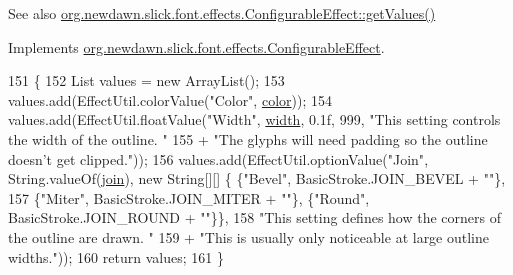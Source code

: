 \begin{DoxySeeAlso}{See also}
\mbox{\hyperlink{interfaceorg_1_1newdawn_1_1slick_1_1font_1_1effects_1_1_configurable_effect_ac4ea8fedf0f9d7ca7ffe1bd5543d78cb}{org.\+newdawn.\+slick.\+font.\+effects.\+Configurable\+Effect\+::get\+Values()}} 
\end{DoxySeeAlso}


Implements \mbox{\hyperlink{interfaceorg_1_1newdawn_1_1slick_1_1font_1_1effects_1_1_configurable_effect_ac4ea8fedf0f9d7ca7ffe1bd5543d78cb}{org.\+newdawn.\+slick.\+font.\+effects.\+Configurable\+Effect}}.


\begin{DoxyCode}
151                              \{
152         List values = \textcolor{keyword}{new} ArrayList();
153         values.add(EffectUtil.colorValue(\textcolor{stringliteral}{"Color"}, \mbox{\hyperlink{classorg_1_1newdawn_1_1slick_1_1font_1_1effects_1_1_outline_effect_a00160c4c005cb659d45c135a2798005f}{color}}));
154         values.add(EffectUtil.floatValue(\textcolor{stringliteral}{"Width"}, \mbox{\hyperlink{classorg_1_1newdawn_1_1slick_1_1font_1_1effects_1_1_outline_effect_aad96e33c4fb5804e7423df04e1cc1936}{width}}, 0.1f, 999, \textcolor{stringliteral}{"This setting controls the width
       of the outline. "}
155             + \textcolor{stringliteral}{"The glyphs will need padding so the outline doesn't get clipped."}));
156         values.add(EffectUtil.optionValue(\textcolor{stringliteral}{"Join"}, String.valueOf(\mbox{\hyperlink{classorg_1_1newdawn_1_1slick_1_1font_1_1effects_1_1_outline_effect_a913a20571098d37c45f5aff95ff844f9}{join}}), \textcolor{keyword}{new} String[][] \{ \{\textcolor{stringliteral}{"Bevel"}, 
      BasicStroke.JOIN\_BEVEL + \textcolor{stringliteral}{""}\},
157             \{\textcolor{stringliteral}{"Miter"}, BasicStroke.JOIN\_MITER + \textcolor{stringliteral}{""}\}, \{\textcolor{stringliteral}{"Round"}, BasicStroke.JOIN\_ROUND + \textcolor{stringliteral}{""}\}\},
158             \textcolor{stringliteral}{"This setting defines how the corners of the outline are drawn. "}
159                 + \textcolor{stringliteral}{"This is usually only noticeable at large outline widths."}));
160         \textcolor{keywordflow}{return} values;
161     \}
\end{DoxyCode}
\mbox{\label{classorg_1_1newdawn_1_1slick_1_1font_1_1effects_1_1_outline_effect_a4e38d6349e329f70056eaed9dece69a3}} 
